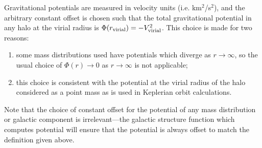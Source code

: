 Gravitational potentials are measured in velocity units (i.e. km$^2$/s$^2$), and the arbitrary constant offset is chosen such that the total gravitational potential in any halo at the virial radius is $\Phi(r_{\rm virial})=-V_{\rm virial}^2$. This choice is made for two reasons:
\begin{enumerate}
\item some mass distributions used have potentials which diverge as $r\rightarrow\infty$, so the usual choice of $\Phi(r) \rightarrow 0$ as $r \rightarrow \infty$ is not applicable;
\item this choice is consistent with the potential at the virial radius of the halo considered as a point mass as is used in Keplerian orbit calculations.
\end{enumerate}
Note that the choice of constant offset for the potential of any mass distribution or galactic component is irrelevant---the galactic structure function which computes potential will ensure that the potential is always offset to match the definition given above.
